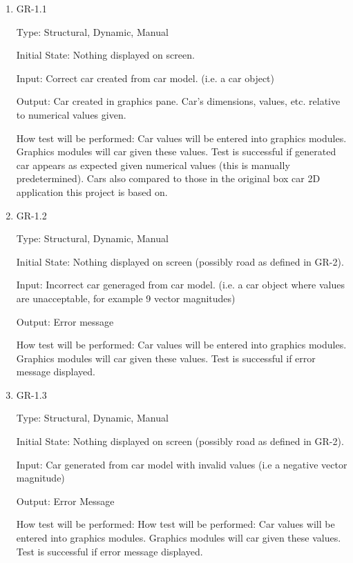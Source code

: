 \documentclass[12pt, titlepage]{article}
\begin{document}
\begin{enumerate}

\item{GR-1.1\\}

Type: Structural, Dynamic, Manual
					
Initial State: Nothing displayed on screen.
					
Input: Correct car created from car model. (i.e. a car object)
					
Output: Car created in graphics pane. Car's dimensions, values, etc. relative to numerical values given.
					
How test will be performed: Car values will be entered into graphics modules. Graphics modules will car given these values. Test is  successful if generated car appears as expected given numerical values (this is manually predetermined). Cars also compared to those in the original box car 2D application this project is based on.

\item{GR-1.2\\}

Type: Structural, Dynamic, Manual
					
Initial State: Nothing displayed on screen (possibly road as defined in GR-2).
					
Input: Incorrect car generaged from car model. (i.e. a car object where values are unacceptable, for example 9 vector magnitudes)
					
Output: Error message
					
How test will be performed: Car values will be entered into graphics modules. Graphics modules will car given these values. Test is successful if error message displayed.

\item{GR-1.3\\}

Type: Structural, Dynamic, Manual
					
Initial State: Nothing displayed on screen (possibly road as defined in GR-2).
					
Input: Car generated from car model with invalid values (i.e a negative vector magnitude)
					
Output: Error Message
					
How test will be performed: How test will be performed: Car values will be entered into graphics modules. Graphics modules will car given these values. Test is successful if error message displayed.
					

\end{enumerate}
\end{document}
